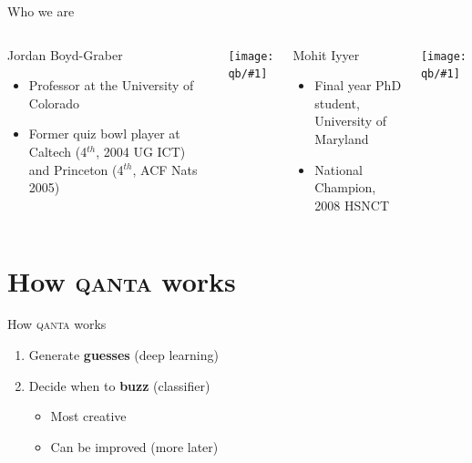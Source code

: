 \documentclass[compress]{beamer}
\newcommand{\gfxq}[2]{
\begin{center}
	\texttt{[image: qb/\#1]}
\end{center}
}
\begin{document}
\begin{frame}{Who we are}

	\begin{columns}
			\begin{block}{Jordan Boyd-Graber}
			
			\begin{itemize}
				\item Professor at the University of Colorado
				\item Former quiz bowl player at Caltech (4$^{th}$, 2004 UG ICT) and Princeton (4$^{th}$, ACF Nats 2005)
			\end{itemize}
			
			\end{block}
			\gfxq{jordan_qb}{.5}
		
		
			\begin{block}{Mohit Iyyer}
			
			\begin{itemize}
				\item Final year PhD student, University of Maryland
				\item National Champion, 2008 HSNCT
			\end{itemize}
			
			\end{block}
			\gfxq{mohit_qb}{.5}	
	\end{columns}

\end{frame}

\section{How \textsc{qanta} works}

\begin{frame}{How \textsc{qanta} works}
	\begin{enumerate}
		\item Generate {\bf guesses} (deep learning)
		\item Decide when to {\bf buzz} (classifier)
			\begin{itemize}
				\item Most creative
				\item Can be improved (more later)
			\end{itemize}
	\end{enumerate}
\end{frame}
\end{document}
